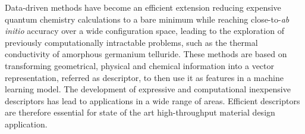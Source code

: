 Data-driven methods have become an efficient extension reducing expensive quantum chemistry calculations to a bare minimum while reaching close-to-\textit{ab initio} accuracy over a wide configuration space\cite{bartok2018machine}, leading to the exploration of previously computationally intractable problems, such as the thermal conductivity of amorphous germanium telluride\cite{sosso2012thermal}.
These methods are based on transforming geometrical, physical and chemical information into a vector representation, referred as descriptor, to then use it as features in a machine learning model.
The development of expressive and computational inexpensive descriptors\cite{behler2011atom, bartok2013representing} has lead to applications in a wide range of areas\cite{mansouri2018machine, sosso2018understanding, basdogan2019machine}.
Efficient descriptors are therefore essential for state of the art high-throughput material design application.

